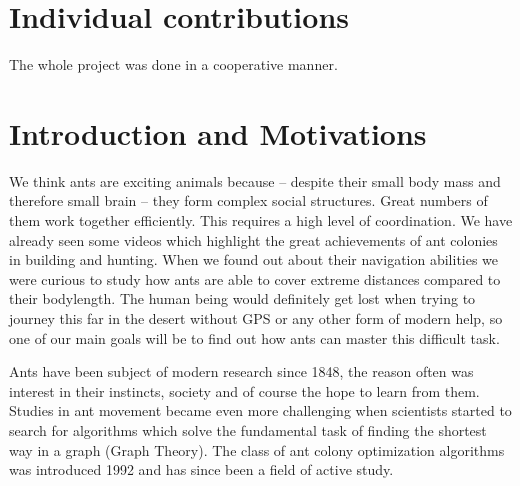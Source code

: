 \documentclass[11pt]{article}
\begin{document}
\newpage


\tableofcontents

\newpage






\section{Individual contributions}
The whole project was done in a cooperative manner.
\newpage

\section{Introduction and Motivations}

We think ants are exciting animals because -- despite their small body mass and therefore small brain -- they form complex social structures. Great numbers of them work together efficiently. This requires a high level of coordination. We have already seen some videos which highlight the great achievements of ant colonies in building and hunting. When we found out about their navigation abilities we were curious to study how ants are able to cover extreme distances compared to their bodylength. The human being would definitely get lost when trying to journey this far in the desert without GPS or any other form of modern help, so one of our main goals will be to find out how ants can master this difficult task\cite{kreis}.

Ants have been subject of modern research since 1848, the reason often was interest in their instincts, society and of course the hope to learn from them. Studies in ant movement became even more challenging when scientists started to search for algorithms which solve the fundamental task of finding the shortest way in a graph (Graph Theory\cite{wiki1}). The class of ant colony optimization algorithms was introduced 1992 and has since been a field of active study\cite{wiki2}.
\end{document}
